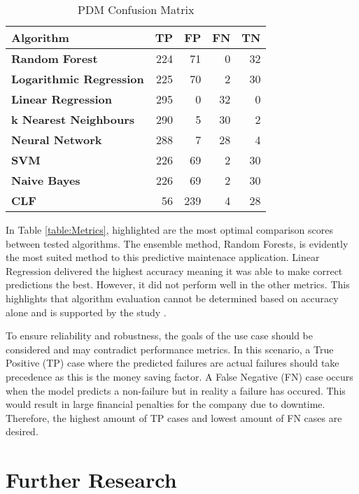 \begin{table}[h]    
    \centering
    \caption{PDM Confusion Matrix}
    \label{table:Conf}
    \begin{tabular}{lrrrr}
        \toprule
        \textbf{Algorithm} &   \textbf{TP} &   \textbf{FP} &  \textbf{FN} &  \textbf{TN} \\
        \midrule
        \textbf{Random Forest} &  224 &   71 &   0 &  32 \\
        \textbf{Logarithmic Regression} &  225 &   70 &   2 &  30 \\
        \textbf{Linear Regression} &  295 &    0 &  32 &   0 \\
        \textbf{k Nearest Neighbours} &  290 &    5 &  30 &   2 \\
        \textbf{Neural Network} &  288 &    7 &  28 &   4 \\
        \textbf{SVM} &  226 &   69 &   2 &  30 \\
        \textbf{Naive Bayes} &  226 &   69 &   2 &  30 \\
        \textbf{CLF} &   56 &  239 &   4 &  28 \\
        \bottomrule
    \end{tabular}
\end{table}

In Table \ref{table:Metrics}, highlighted are the most optimal comparison scores between tested algorithms.
The ensemble method, Random Forests, is evidently the most suited method to this predictive maintenace application.
Linear Regression delivered the highest accuracy meaning it was able to make correct predictions the best. 
However, it did not perform well in the other metrics. 
This highlights that algorithm evaluation cannot be determined based on accuracy alone and is supported by the study \cite{8320256}.

To ensure reliability and robustness, the goals of the use case should be considered and may contradict performance metrics.
In this scenario, a True Positive (TP) case where the predicted failures are actual failures should take precedence as this is the money saving factor. 
A False Negative (FN) case occurs when the model predicts a non-failure but in reality a failure has occured. This would result in large financial penalties for the company due to downtime.
Therefore, the highest amount of TP cases and lowest amount of FN cases are desired.

\section{Further Research}

